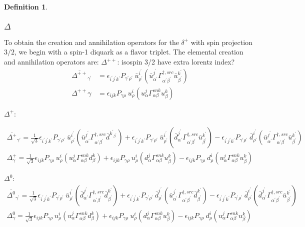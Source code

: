 \documentclass[prd,12pt,superscriptaddress,tightenlines,nofootinbib]{revtex4}
\def\a{{\alpha}}
\def\b{{\beta}}
\def\g{{\gamma}}
\def\G{{\Gamma}}
\def\ip{{i^\prime}}
\def\jp{{j^\prime}}
\def\kp{{k^\prime}}
\def\ap{{\alpha^\prime}}
\def\bp{{\beta^\prime}}
\def\gp{{\gamma^\prime}}
\def\rp{{\rho^\prime}}
\theoremstyle{plain}
\theoremstyle{definition}
\newtheorem{defn}[thm]{Definition}
\theoremstyle{remark}
\begin{document}
\begin{defn}
\subsubsection*{$\Delta$}
To obtain the creation and annihilation operators for the $\delta^+$ with spin projection 
$3/2$, we begin with a spin-1 diquark as a flavor triplet. The elemental creation and annihilation operators are:
$\Delta^{++}$: 
isospin 3/2 have extra lorentz index?
\begin{align}
	\overline{\Delta^{++}}_{\gp} &= \epsilon_{\ip\jp\kp} P_{\gp\rp}\ \bar{u}^\ip_\rp (\bar{u}^{\jp}_{\ap} \G^{\dagger,src}_{\ap\bp} \bar{u}^\kp_\bp ) 
	\\
	\Delta^{++}{\g} &= \epsilon_{ijk} P_{\g\rho}\ u^i_\rho (u^j_\a \G^{snk}_{\a\b} u^k_\b ) 
\end{align}

$\Delta^{+}$: 

\begin{gather}
\overline{\Delta^{+}}_{\gp} =  \frac{1}{\sqrt{3}}\epsilon_{\ip\jp\kp} P_{\gp\rp}\ \bar{u}^\ip_\rp (\bar{u}^{\jp}_{\ap} \G^{\dagger,src}_{\ap\bp} \bar{d}^{\kp_\bp} ) 
+ \epsilon_{\ip\jp\kp} P_{\gp\rp}\ \bar{u}^\ip_\rp (\bar{d}^{\jp}_{\ap} \G^{\dagger,src}_{\ap\bp} \bar{u}^\kp_\bp ) -
\epsilon_{\ip\jp\kp} P_{\gp\rp}\ \bar{d}^\ip_\rp (\bar{u}^{\jp}_{\ap} \G^{\dagger,src}_{\ap\bp} \bar{u}^\kp_\bp ) 
\\
\Delta^{+}_{\g} = \frac{1}{\sqrt{3}}\epsilon_{ijk} P_{\g\rho}\ u^i_\rho (u^j_\a \G^{snk}_{\a\b} d^k_\b ) +  \epsilon_{ijk} P_{\g\rho}\ u^i_\rho (d^j_\a \G^{snk}_{\a\b} u^k_\b ) - 
\epsilon_{ijk} P_{\g\rho}\ d^i_\rho (u^j_\a \G^{snk}_{\a\b} u^k_\b ) 
\end{gather}

$\Delta^{0}$: 
	\begin{gather}
		\overline{\Delta^{0}}_{\gp} =  \frac{1}{\sqrt{3}}\epsilon_{\ip\jp\kp} P_{\gp\rp}\ \bar{u}^\ip_\rp (\bar{d}^{\jp}_{\ap} \G^{\dagger,src}_{\ap\bp} \bar{d}^\kp_\bp ) 
		+ \epsilon_{\ip\jp\kp} P_{\gp\rp}\ \bar{d}^\ip_\rp (\bar{u}^{\jp}_{\ap} \G^{\dagger,src}_{\ap\bp} \bar{d}^\kp_\bp ) -
		\epsilon_{\ip\jp\kp} P_{\gp\rp}\ \bar{d}^\ip_\rp (\bar{d}^{\jp}_{\ap} \G^{\dagger,src}_{\ap\bp} \bar{u}^\kp_\bp ) 
		\\
		\Delta^{0}_{\g} = \frac{1}{\sqrt{3}}\epsilon_{ijk} P_{\g\rho}\ u^i_\rho (u^j_\a \G^{snk}_{\a\b} d^k_\b ) +  \epsilon_{ijk} P_{\g\rho}\ u^i_\rho (d^j_\a \G^{snk}_{\a\b} u^k_\b ) - 
		\epsilon_{ijk} P_{\g\rho}\ d^i_\rho (u^j_\a \G^{snk}_{\a\b} u^k_\b ) 
	\end{gather}


\end{defn}
\end{document}
